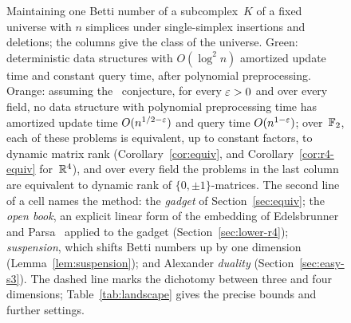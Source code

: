 \begin{figure}[t]
\caption{Maintaining one Betti number of a subcomplex~$K$ of a fixed universe with $n$ simplices under single-simplex insertions and deletions; the columns give the class of the universe.
Green: deterministic data structures with $O(\log^2 n)$ amortized update time and constant query time, after polynomial preprocessing.
Orange: assuming the \OMv\ conjecture, for every $\varepsilon>0$ and over every field, no data structure with polynomial preprocessing time has amortized update time $O(n^{1/2-\varepsilon})$ and query time $O(n^{1-\varepsilon})$; over~$\mathbb{F}_2$, each of these problems is equivalent, up to constant factors, to dynamic matrix rank (Corollary~\ref{cor:equiv}, and Corollary~\ref{cor:r4-equiv} for~$\mathbb{R}^4$), and over every field the problems in the last column are equivalent to dynamic rank of $\{0,\pm1\}$-matrices.
The second line of a cell names the method: the \emph{gadget} of Section~\ref{sec:equiv}; the \emph{open book}, an explicit linear form of the embedding of Edelsbrunner and Parsa~\cite{EP14} applied to the gadget (Section~\ref{sec:lower-r4}); \emph{suspension}, which shifts Betti numbers up by one dimension (Lemma~\ref{lem:suspension}); and Alexander \emph{duality} (Section~\ref{sec:easy-s3}).
The dashed line marks the dichotomy between three and four dimensions; Table~\ref{tab:landscape} gives the precise bounds and further settings.}
\label{fig:landscape}
\end{figure}
